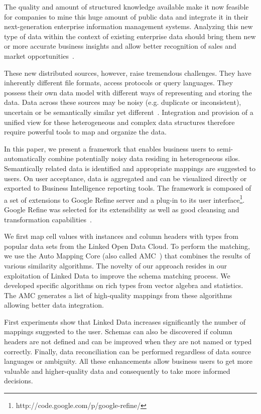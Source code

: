 \documentclass{sig-alternate}
\begin{document}
The quality and amount of structured knowledge available make it now feasible for companies to mine this huge amount of public data and integrate it in their next-generation enterprise information management systems. Analyzing this new type of data within the context of existing enterprise data should bring them new or more accurate business insights and allow better recognition of sales and market opportunities~\cite{bigData}.

These new distributed sources, however, raise tremendous challenges. They have inherently different file formats, access protocols or query languages. They possess their own data model with different ways of representing and storing the data. Data across these sources may be noisy (e.g. duplicate or inconsistent), uncertain or be semantically similar yet different~\cite{kavitha}. Integration and provision of a unified view for these heterogeneous and complex data structures therefore require powerful tools to map and organize the data.

In this paper, we present a framework that enables business users to semi-automatically combine potentially noisy data residing in heterogeneous silos. Semantically related data is identified and appropriate mappings are suggested to users. On user acceptance, data is aggregated and can be visualized directly or exported to Business Intelligence reporting tools. The framework is composed of a set of extensions to Google Refine server and a plug-in to its user interface\footnote{http://code.google.com/p/google-refine/}. Google Refine was selected for its extensibility as well as good cleansing and transformation capabilities~\cite{bizer_linked_2009}.

We first map cell values with instances and column headers with types from popular data sets from the Linked Open Data Cloud. To perform the matching, we use the Auto Mapping Core (also called AMC~\cite{conf/icde/PeukertER12}) that combines the results of various similarity algorithms. The novelty of our approach resides in our exploitation of Linked Data to improve the schema matching process. We developed specific algorithms on rich types from vector algebra and statistics. The AMC generates a list of high-quality mappings from these algorithms allowing better data integration.

First experiments show that Linked Data increases significantly the number of mappings suggested to the user. Schemas can also be discovered if column headers are not defined and can be improved when they are not named or typed correctly. Finally, data reconciliation can be performed regardless of data source languages or ambiguity. All these enhancements allow business users to get more valuable and higher-quality data and consequently to take more informed decisions.
\end{document}
